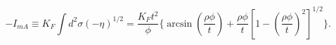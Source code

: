\begin{equation}
\label{minkarea1}
-I_{mA}\equiv K_F\int d^2\sigma (-\eta )^{1/2}= \frac{K_Ft^2}{\phi}\{\arcsin (\frac{\rho \phi}{t})+\frac{\rho \phi}{t}[1-(\frac{\rho \phi}{t})^2]^{1/2}\}.
\end{equation}

